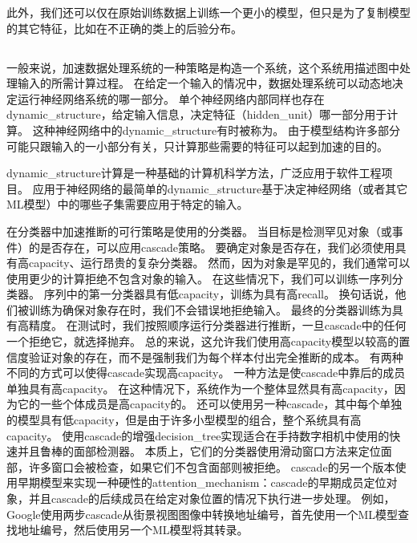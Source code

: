 此外，我们还可以仅在原始训练数据上训练一个更小的模型，但只是为了复制模型的其它特征，比如在不正确的类上的后验分布\citep{Hinton-dark-2014,hinton2015distilling}。

\subsection{}
\label{sec:dynamic_structure}

一般来说，加速数据处理系统的一种策略是构造一个系统，这个系统用描述图中处理输入的所需计算过程。
在给定一个输入的情况中，数据处理系统可以动态地决定运行神经网络系统的哪一部分。
单个神经网络内部同样也存在\gls{dynamic_structure}，给定输入信息，决定特征（\gls{hidden_unit}）哪一部分用于计算。
这种神经网络中的\gls{dynamic_structure}有时被称为\citep{bengio2013estimating,bengio-arxiv13-condcomp}。
由于模型结构许多部分可能只跟输入的一小部分有关，只计算那些需要的特征可以起到加速的目的。

\gls{dynamic_structure}计算是一种基础的计算机科学方法，广泛应用于软件工程项目。
应用于神经网络的最简单的\gls{dynamic_structure}基于决定神经网络（或者其它\gls{ML}模型）中的哪些子集需要应用于特定的输入。

在分类器中加速推断的可行策略是使用的分类器。
当目标是检测罕见对象（或事件）的是否存在，可以应用\gls{cascade}策略。
要确定对象是否存在，我们必须使用具有高\gls{capacity}、运行昂贵的复杂分类器。 
然而，因为对象是罕见的，我们通常可以使用更少的计算拒绝不包含对象的输入。
在这些情况下，我们可以训练一序列分类器。
序列中的第一分类器具有低\gls{capacity}，训练为具有高\gls{recall}。
换句话说，他们被训练为确保对象存在时，我们不会错误地拒绝输入。
最终的分类器训练为具有高精度。
在测试时，我们按照顺序运行分类器进行推断，一旦\gls{cascade}中的任何一个拒绝它，就选择抛弃。
总的来说，这允许我们使用高\gls{capacity}模型以较高的置信度验证对象的存在，而不是强制我们为每个样本付出完全推断的成本。
有两种不同的方式可以使得\gls{cascade}实现高\gls{capacity}。
一种方法是使\gls{cascade}中靠后的成员单独具有高\gls{capacity}。
在这种情况下，系统作为一个整体显然具有高\gls{capacity}，因为它的一些个体成员是高\gls{capacity}的。 
还可以使用另一种\gls{cascade}，其中每个单独的模型具有低\gls{capacity}，但是由于许多小型模型的组合，整个系统具有高\gls{capacity}。
\citet{Viola01}使用\gls{cascade}的增强\gls{decision_tree}实现适合在手持数字相机中使用的快速并且鲁棒的面部检测器。
本质上，它们的分类器使用滑动窗口方法来定位面部，许多窗口会被检查，如果它们不包含面部则被拒绝。
\gls{cascade}的另一个版本使用早期模型来实现一种硬性的\gls{attention_mechanism}：\gls{cascade}的早期成员定位对象，并且\gls{cascade}的后续成员在给定对象位置的情况下执行进一步处理。
例如，Google使用两步\gls{cascade}从街景视图图像中转换地址编号，首先使用一个\gls{ML}模型查找地址编号，然后使用另一个\gls{ML}模型将其转录\citep{Goodfellow+et+al-ICLR2014a}。


